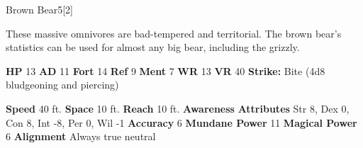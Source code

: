   
  \begin{monsection}{Brown Bear}{5}[2]
    \vspace{-1em}\vspace{-1em}
    \vspace{0em}

    
      These massive omnivores are bad-tempered and territorial.
      The brown bear's statistics can be used for almost any big bear, including the grizzly.
    
    

    \begin{spellcontent}
      \begin{spelltargetinginfo}
        \pari \textbf{HP} 13 \monsep
          \textbf{AD} 11 \monsep
          \textbf{Fort} 14 \monsep
          \textbf{Ref} 9 \monsep
          \textbf{Ment} 7
        \pari \textbf{WR} 13 \monsep
        \textbf{VR} 40
        \pari \textbf{Strike:}
            Bite  (4d8 bludgeoning and piercing)
      \end{spelltargetinginfo}
    \end{spellcontent}
    \begin{monsterfooter}
      \pari \textbf{Speed} 40 ft. \monsep
        \textbf{Space} 10 ft. \monsep
        \textbf{Reach} 10 ft.
      \pari \textbf{Awareness} 
      \pari \textbf{Attributes}
        Str 8, Dex 0,
        Con 8, Int -8,
        Per 0, Wil -1
      \pari \textbf{Accuracy} 6 \monsep
        \textbf{Mundane Power} 11 \monsep
      \textbf{Magical Power} 6
      \pari \textbf{Alignment} Always true neutral
    \end{monsterfooter}
  \end{monsection}
  
